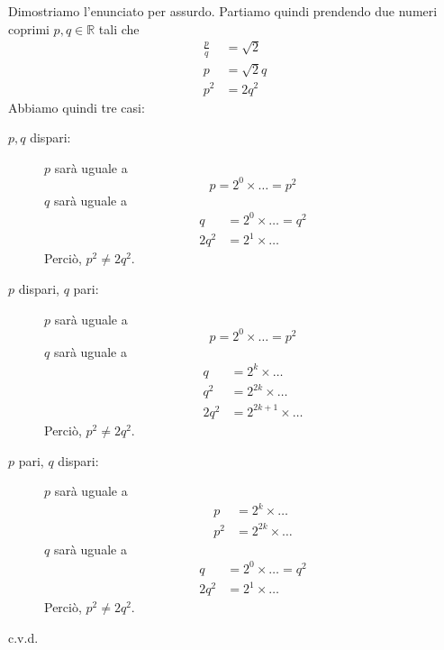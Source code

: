 \documentclass[../../analisi1]{subfiles}
\begin{document}
            Dimostriamo l'enunciato per assurdo.
            Partiamo quindi prendendo due numeri coprimi \(p, q \in \mathbb{R}\) tali che
            \begin{align*}
                \frac{p}{q} &= \sqrt{2}\\
                p &= \sqrt{2} q\\
                p^2 &= 2 q^2
            \end{align*}
            Abbiamo quindi tre casi:
            \begin{description}
                \item[\(p, q\) dispari:]
                    \(p\) sarà uguale a
                    \[
                        p = 2^0 \times \dots = p^2
                    \]
                    \(q\) sarà uguale a
                    \begin{align*}
                        q &= 2^0 \times \dots = q^2\\
                        2q^2 &= 2^1 \times \dots
                    \end{align*}
                    Perciò, \(p^2 \neq 2q^2\).
                \item[\(p\) dispari, \(q\) pari:]
                    \(p\) sarà uguale a
                    \[
                        p = 2^0 \times \dots = p^2
                    \]
                    \(q\) sarà uguale a
                    \begin{align*}
                        q &= 2^k \times \dots\\
                        q^2 &= 2^{2k} \times \dots\\
                        2q^2 &= 2^{2k + 1} \times \dots
                    \end{align*}
                    Perciò, \(p^2 \neq 2q^2\).
                \newpage
                \item[\(p\) pari, \(q\) dispari:]
                    \(p\) sarà uguale a
                    \begin{align*}
                        p &= 2^k \times \dots\\
                        p^2 &= 2^{2k} \times \dots
                    \end{align*}
                    \(q\) sarà uguale a
                    \begin{align*}
                        q &= 2^0 \times \dots = q^2\\
                        2q^2 &= 2^1 \times \dots
                    \end{align*}
                    Perciò, \(p^2 \neq 2q^2\).
            \end{description}
            c.v.d.
            
\end{document}

